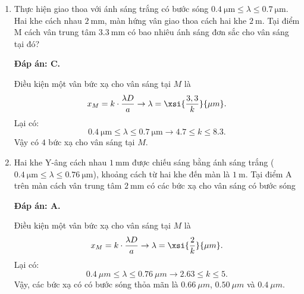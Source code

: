 \begin{enumerate}[label=\bfseries Câu \arabic*:]
	\item {} 
		\cauhoi
	{Thực hiện giao thoa với ánh sáng trắng có bước sóng $\SI{0.4}{\micro \meter} \leq \lambda \leq \SI{0.7}{\micro \meter}$. Hai khe cách nhau $\SI{2}{\milli \meter}$, màn hứng vân giao thoa cách hai khe $\SI{2}{\meter}$. Tại điểm M cách vân trung tâm $\SI{3.3}{\milli \meter}$ có bao nhiêu ánh sáng đơn sắc cho vân sáng tại đó?
	}
	
	\loigiai
	{		\textbf{Đáp án: C.}
		
Điều kiện một vân bức xạ cho vân sáng tại $ M $ là
$$
	x_{M} = k \cdot \dfrac{\lambda D}{a} \rightarrow \lambda = \xsi{\dfrac{3,3}{k}}{\mu m}.
$$
Lại có:
$$
	\SI{0.4}{\micro \meter} \leq \lambda \leq \SI{0.7}{\micro \meter} \rightarrow \num{4,7} \leq k \leq \num{8,3}.
$$
Vậy có $ 4 $ bức xạ cho vân sáng tại $ M $.
		
	}
	
	\item {} 
		\cauhoi
	{Hai khe Y-âng cách nhau $\SI{1}{\milli \meter}$ được chiếu sáng bằng ánh sáng trắng ($\SI{0.4}{\micro \meter} \leq \lambda \leq \SI{0.76}{\micro \meter}$), khoảng cách từ hai khe đến màn là $\SI{1}{\meter}$. Tại điểm A trên màn cách vân trung tâm $\SI{2}{\milli \meter}$ có các bức xạ cho vân sáng có bước sóng
	}
	
	\loigiai
	{		\textbf{Đáp án: A.}
		
Điều kiện một vân bức xạ cho vân sáng tại $ M $ là
$$
	x_{M} = k \cdot \dfrac{\lambda D}{a} \rightarrow \lambda = \xsi{\dfrac{2}{k}}{\mu m}.
$$
Lại có:
$$
	\SI{0,4}{\mu m} \leq \lambda \leq \SI{0,76}{\mu m} \rightarrow \num{2,63} \leq k \leq \num{5}.
$$
Vậy, các bức xạ có có bước sóng thỏa mãn là $ \SI{0,66}{\mu m} $, $ \SI{0,50}{\mu m} $ và $ \SI{0,4}{\mu m} $.
	}
	

\end{enumerate}
